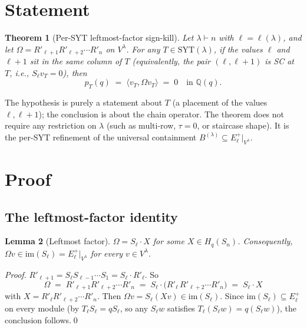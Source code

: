 \documentclass[11pt]{article}
\newtheorem{theorem}{Theorem}
\newtheorem{lemma}[theorem]{Lemma}
\theoremstyle{definition}
\newcommand{\Hq}{H_q}
\newcommand{\Sn}{S_n}
\newcommand{\Vlam}{V^\lambda}
\newcommand{\Om}{\Omega}
\newcommand{\Rp}{{R'}}
\newcommand{\SYT}{\mathrm{SYT}}
\newcommand{\Eplus}{E^+}
\newcommand{\im}{\mathrm{im}}
\newcommand{\pT}{p_T}
\begin{document}
\section{Statement}\label{sec:statement}

\begin{theorem}[Per-SYT leftmost-factor sign-kill]\label{thm:main}
Let $\lambda \vdash n$ with $\ell = \ell(\lambda)$, and let
$\Om = \Rp_{\ell+1} \Rp_{\ell+2} \cdots \Rp_n$ on $\Vlam$. For any
$T \in \SYT(\lambda)$, if the values $\ell$ and $\ell+1$ sit in the same
column of $T$ (equivalently, the pair $(\ell, \ell+1)$ is SC at $T$, i.e.,
$S_\ell v_T = 0$), then
\[
   \pT(q) \;=\; \langle v_T, \Om v_T \rangle \;=\; 0
   \quad \text{in } \mathbb{Q}(q).
\]
\end{theorem}

The hypothesis is purely a statement about $T$ (a placement of the values
$\ell, \ell+1$); the conclusion is about the chain operator. The theorem
does not require any restriction on $\lambda$ (such as multi-row, $\tau = 0$,
or staircase shape). It is the per-SYT refinement of the universal
containment $B^{(\lambda)} \subseteq \Eplus_\ell|_{\Vlam}$.

\section{Proof}\label{sec:proof}

\subsection*{The leftmost-factor identity}

\begin{lemma}[Leftmost factor]\label{lem:leftmost}
$\Om = S_\ell \cdot X$ for some $X \in \Hq(\Sn)$. Consequently,
$\Om v \in \im(S_\ell) = \Eplus_\ell|_{\Vlam}$ for every $v \in \Vlam$.
\end{lemma}

\begin{proof}
$\Rp_{\ell+1} = S_\ell S_{\ell-1} \cdots S_1 = S_\ell \cdot \Rp_\ell$. So
\[
   \Om \;=\; \Rp_{\ell+1} \Rp_{\ell+2} \cdots \Rp_n
        \;=\; S_\ell \cdot \bigl( \Rp_\ell \,\Rp_{\ell+2} \cdots \Rp_n \bigr)
        \;=\; S_\ell \cdot X
\]
with $X = \Rp_\ell \Rp_{\ell+2} \cdots \Rp_n$. Then
$\Om v = S_\ell (X v) \in \im(S_\ell)$. Since $\im(S_\ell) \subseteq \Eplus_\ell$
on every module (by $T_\ell S_\ell = q S_\ell$, so any $S_\ell w$ satisfies
$T_\ell (S_\ell w) = q (S_\ell w)$), the conclusion follows.\qed
\end{proof}
\end{document}
